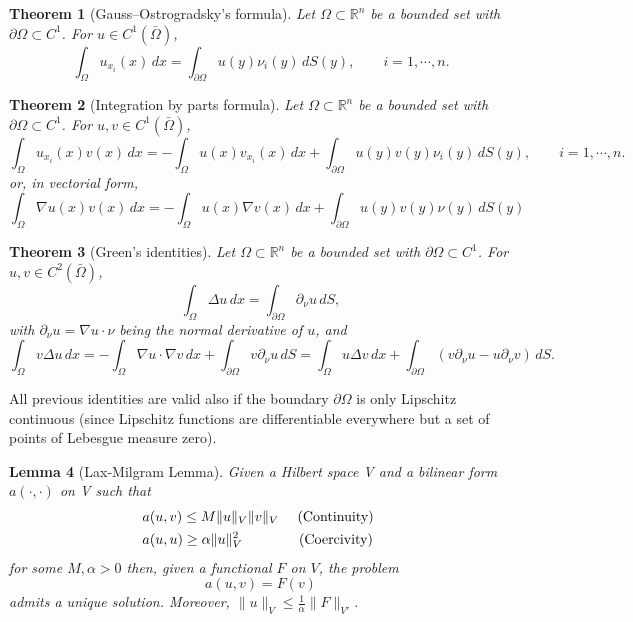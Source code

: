 \documentclass{article}
\newtheorem{thm}{Theorem}[section]
\newtheorem{lemma}[thm]{Lemma}
\begin{document}
\begin{thm}[Gauss--Ostrogradsky's formula]\label{thm:div}
Let $\Omega \subset \mathbb{R}^n$ be a bounded set with $\partial\Omega \subset C^1$. For $u \in C^1(\bar{\Omega})$,
\[
\int_\Omega u_{x_i}(x)\,dx = \int_{\partial\Omega} u(y)\nu_i(y)\,dS(y), \qquad i = 1, \cdots, n.
\]
\end{thm}

\begin{thm}[Integration by parts formula] \label{thm:by_parts}
Let $\Omega \subset \mathbb{R}^n$ be a bounded set with $\partial\Omega \subset C^1$. For $u, v \in C^1(\bar{\Omega})$,
\[
\int_\Omega u_{x_i}(x)v(x)\,dx = -\int_\Omega u(x)v_{x_i}(x)\,dx + \int_{\partial\Omega} u(y)v(y)\nu_i(y)\,dS(y), \qquad i = 1, \cdots, n.
\]
or, in vectorial form,
\[
\int_\Omega \nabla u(x)v(x)\,dx = -\int_\Omega u(x)\nabla v(x)\,dx + \int_{\partial\Omega} u(y)v(y)\nu(y)\,dS(y)
\]
\end{thm}

\begin{thm}[Green’s identities] \label{thm:green_id}
Let $\Omega \subset \mathbb{R}^n$ be a bounded set with $\partial\Omega \subset C^1$. For $u, v \in C^2(\bar{\Omega})$,
\[
\int_\Omega \Delta u\,dx = \int_{\partial\Omega} \partial_\nu u\,dS,
\]
with $\partial_\nu u = \nabla u \cdot \nu$ being the normal derivative of $u$, and
\[
\int_\Omega v \Delta u\,dx = -\int_\Omega \nabla u \cdot \nabla v\,dx + \int_{\partial\Omega} v\partial_\nu u\,dS = \int_\Omega u\Delta v\,dx + \int_{\partial\Omega} (v \partial_\nu u - u \partial_\nu v)\,dS.
\]
\end{thm}

All previous identities are valid also if the boundary $\partial\Omega$ is only Lipschitz continuous (since Lipschitz functions are differentiable everywhere but a set of points of Lebesgue measure zero).


\begin{lemma}[Lax-Milgram Lemma]\label{lemma:lax_mil}
    Given a Hilbert space V and a bilinear form $a(\cdot, \cdot)$ on V such that
    \begin{align*}
        & a(u,v) \leq M \| u\|_V \| v\|_V \quad \text{ (Continuity) }\\
        &a(u,u) \geq \alpha \| u\|_V^2 \qquad \hspace{6mm} \text{ (Coercivity) }
    \end{align*}
    for some $M,\alpha>0$ then, given a functional $F$ on $V$, the problem
    \begin{equation*}
        a(u,v) = F(v)
    \end{equation*}
    admits a unique solution. Moreover, $\| u\|_V \leq \frac{1}{\alpha} \| F\|_{V'}$.
\end{lemma}

    
\end{document}
